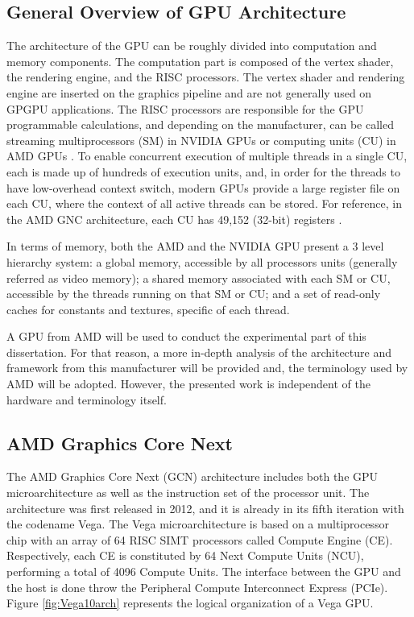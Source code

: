 \subsection{General Overview of GPU Architecture}
The architecture of the GPU can be roughly divided into computation and memory components. The computation part is composed of the vertex shader, the rendering engine, and the RISC processors. The vertex shader and rendering engine are inserted on the graphics pipeline and are not generally used on GPGPU applications. The RISC processors are responsible for the GPU programmable calculations, and depending on the manufacturer, can be called streaming multiprocessors (SM) in NVIDIA GPUs \cite{nvidia_cuda_nodate} or computing units (CU) in AMD GPUs \cite{amd_amd_nodate}.  To enable concurrent execution of multiple threads in a single CU, each is made up of hundreds of execution units, and, in order for the threads to have low-overhead context switch, modern GPUs provide a large register file on each CU, where the context of all active threads can be stored. For reference, in the AMD GNC architecture, each CU has 49,152 (32-bit) registers \cite{jing_energy-efficient_2013}.

In terms of memory, both the AMD and the NVIDIA GPU present a 3 level hierarchy system: a global memory, accessible by all processors units (generally referred as video memory); a shared memory associated with each SM or CU, accessible by the threads running on that SM or CU; and a set of read-only caches for constants and textures, specific of each thread.

A GPU from AMD will be used to conduct the experimental part of this dissertation. For that reason, a more in-depth analysis of the architecture and framework from this manufacturer will be provided and, the terminology used by AMD will be adopted. However, the presented work is independent of the hardware and terminology itself.

\subsection{AMD Graphics Core Next}

The AMD Graphics Core Next (GCN) \cite{amd_radeons_nodate}  architecture includes both the GPU microarchitecture as well as the instruction set of the processor unit. The architecture was first released in 2012, and it is already in its fifth iteration with the codename Vega. The Vega microarchitecture is based on a multiprocessor chip with an array of 64 RISC SIMT processors called Compute Engine (CE). Respectively, each CE is constituted by 64 Next Compute Units (NCU), performing a total of 4096 Compute Units. The interface between the GPU and the host is done throw the Peripheral Compute Interconnect Express (PCIe). Figure \ref{fig:Vega10arch} represents the logical organization of a Vega GPU.  

